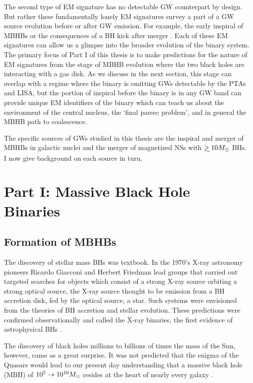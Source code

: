 The second type of EM signature has no detectable GW counterpart by design.
But rather these fundamentally lonely EM signatures survey a part of a GW
source evolution before or after GW emission. For example, the early inspiral
of MBHBs \citep[\textit{e.g.}][]{Haiman+2008, HKM09} or the consequences of a BH
kick after merger \citep[\textit{e.g.}][]{Rosotti:2012}. Each of these EM
signatures can allow us a glimpse into the broader evolution of the binary
system. The primary focus of Part I of this thesis is to make predictions for
the nature of EM signatures from the stage of MBHB evolution where the two
black holes are interacting with a gas disk. As we discuss in the next
section, this stage can overlap with a regime where the binary is emitting GWs
detectable by the PTAs and LISA, but the portion of inspiral before the binary
is in any GW band can provide unique EM identifiers of the binary which can
teach us about the environment of the central nucleus, the `final parsec
problem', and in general the MBHB path to coalescence.

The specific sources of GWs studied in this thesis are the inspiral and merger
of MBHBs in galactic nuclei and the merger of magnetized NSs with $\gsim 10
\Msun$ BHs. I now give background on each source in turn.






\section{Part I: Massive Black Hole Binaries} 
\subsection{Formation of MBHBs}     

The discovery of stellar mass BHs was textbook. In
the 1970's X-ray astronomy pioneers Ricardo Giacconi and Herbert Friedman lead
groups that carried out targeted searches for objects which consist of a
strong X-ray source orbiting a strong optical source, the X-ray source
thought to be emission from a BH accretion disk, fed by the optical source, a
star. Such systems were envisioned from the theories of BH accretion and
stellar evolution. These predictions were confirmed observationally and called
the X-ray binaries, the first evidence of astrophysical BHs 
\citep[an entertaining historical account is found in][]{ThorneBHsTimeWarps:CH8}. 

The discovery of black holes millions to billions of times the mass of the
Sun, however, came as a great surprise. It was not predicted that the enigma
of the Quasars \citep[\textit{e.g.}][]{Schmidt:1963, Salpeter:1964,
LyndenBell:1969} would lead to our present day understanding that a massive
black hole (MBH) of $10^5 \rightarrow 10^{10} {M_{\odot}}$ resides at the heart of
nearly every galaxy \citep{kr95, KormendyHo2013, ff05}.

